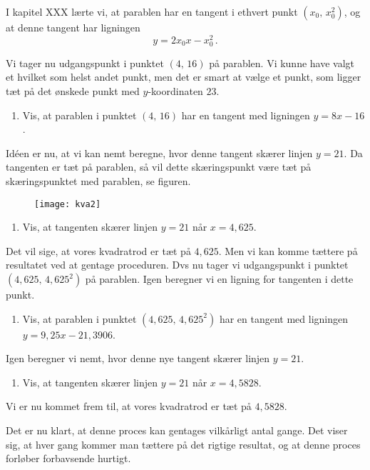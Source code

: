 \documentclass[12pt,oneside,a4paper]{article}
\theoremstyle{plain}
\begin{document}
I kapitel XXX lærte vi, at parablen har en tangent i ethvert punkt $(x_0,\,
x_0^2)$, og at denne tangent har ligningen
\[
    y=2x_0x - x_0^2 \,.
\]

Vi tager nu udgangspunkt i punktet $(4,\,16)$ på parablen. Vi kunne have valgt
et hvilket som helst andet punkt, men det er smart at vælge et punkt, som
ligger tæt på det ønskede punkt med $y$-koordinaten $23$.

\begin{enumerate}[label=(\alph*)]
    \item Vis, at parablen i punktet $(4,\,16)$ har en tangent med ligningen
        $y=8x-16$.
\end{enumerate}

Idéen er nu, at vi kan nemt beregne, hvor denne tangent skærer linjen $y=21$. 
Da tangenten er tæt på parablen, så vil dette skæringspunkt være tæt på 
skæringspunktet med parablen, se figuren.

\begin{figure}[ht]
    \centering
    \texttt{[image: kva2]}
    \caption{}
    \label{fig2}
\end{figure}

\begin{enumerate}[label=(\alph*), resume]
    \item Vis, at tangenten skærer linjen $y=21$ når $x=4,625$.
\end{enumerate}

Det vil sige, at vores kvadratrod er tæt på $4,625$. Men vi kan
komme tættere på resultatet ved at gentage proceduren. Dvs nu tager vi
udgangspunkt i punktet $(4,625,\,4,625^2)$ på parablen. Igen beregner vi en ligning for tangenten i dette punkt.

\begin{enumerate}[label=(\alph*), resume]
    \item Vis, at parablen i punktet $(4,625,\,4,625^2)$ har en tangent med
        ligningen $y=9,25x-21,3906$.
\end{enumerate}
Igen beregner vi nemt, hvor denne nye tangent skærer linjen $y=21$.

\begin{enumerate}[label=(\alph*), resume]
    \item Vis, at tangenten skærer linjen $y=21$ når $x=4,5828$.
\end{enumerate}

Vi er nu kommet frem til, at vores kvadratrod er tæt på $4,5828$.

Det er nu klart, at denne proces kan gentages vilkårligt antal gange.
Det viser sig, at hver gang kommer man tættere på det rigtige resultat, og
at denne proces forløber forbavsende hurtigt.
\end{document}
